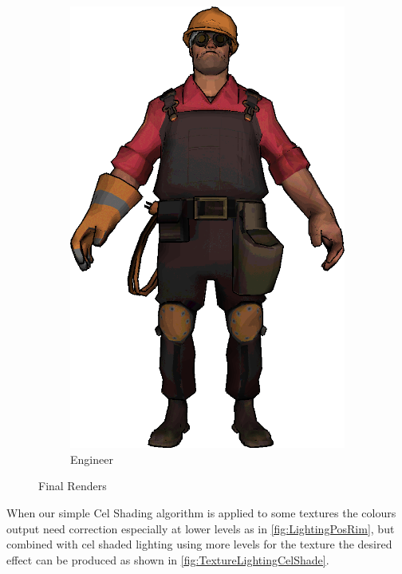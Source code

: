 \begin{figure}[h]
\begin{subfigure}[b]{0.18\textwidth}
        \includegraphics[width=\textwidth]{img/Textures/TextureLightingCelShade.png}
        \caption{Engineer}
 		\label{fig:TextureLightingCelShade}
\end{subfigure}
\caption{Final Renders}
 \label{fig:FinalRenders}
\end{figure} 

When our simple Cel Shading algorithm is applied to some textures the colours output need correction especially at lower levels as in \autoref{fig:LightingPosRim}, but combined with cel shaded lighting using more levels for the texture the desired effect can be produced as shown in \autoref{fig:TextureLightingCelShade}. 


